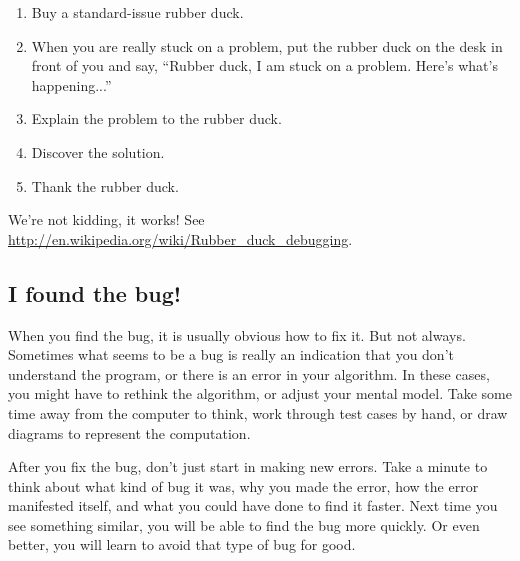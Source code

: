 \documentclass[12pt]{book}
\theoremstyle{exercise}
\begin{document}
\begin{enumerate}

\item Buy a standard-issue rubber duck.

\item When you are really stuck on a problem, put the rubber duck on the desk in front of you and say, ``Rubber duck, I am stuck on a problem.
Here's what's happening...''

\item Explain the problem to the rubber duck.

\item Discover the solution.

\item Thank the rubber duck.

\end{enumerate}

We're not kidding, it works!
See \url{http://en.wikipedia.org/wiki/Rubber_duck_debugging}.


\subsection*{I found the bug!}

When you find the bug, it is usually obvious how to fix it.
But not always.
Sometimes what seems to be a bug is really an indication that you don't understand the program, or there is an error in your algorithm.
In these cases, you might have to rethink the algorithm, or adjust your mental model.
Take some time away from the computer to think, work through test cases by hand, or draw diagrams to represent the computation.

After you fix the bug, don't just start in making new errors.
Take a minute to think about what kind of bug it was, why you made the error, how the error manifested itself, and what you could have done to find it faster.
Next time you see something similar, you will be able to find the bug more quickly.
Or even better, you will learn to avoid that type of bug for good.


\backmatter
\printindex

\end{document}
